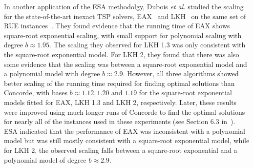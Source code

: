 \documentclass[aic]{iosart2x}
\newcommand{\etal}{\emph{et al.}}
\begin{document}
In another application of the ESA methodolgy, Dubois \etal{} studied the scaling for the state-of-the-art inexact TSP solvers, EAX~\cite{NagKob13} and LKH~\cite{helsgaun2000effective} on the same set of RUE instances~\cite{DubEtAl15}.
They found evidence that the running time of EAX shows square-root exponential scaling, with small support for polynomial scaling with degree $b \approx 1.95$.
The scaling they observed for LKH 1.3 was only consistent with the square-root exponential model. For LKH 2, they found that there was also some evidence that the scaling was between a square-root exponential model and a polynomial model with degree $b \approx 2.9$.
However, all three algorithms showed better scaling of the running time required for finding optimal solutions than Concorde, with bases $b \approx 1.12, 1.20 \text{ and } 1.19$ for the square-root exponential models fitted for EAX, LKH 1.3 and LKH 2, respectively. 
Later, these results were improved using much longer runs of Concorde to find the optimal solutions for nearly all of the instances used in these experiments (see Section 6.3 in~\cite{Mu15}). 
ESA indicated that the performance of EAX was inconsistent with a polynomial model but was still mostly consistent with a square-root exponential model, while for LKH 2, the observed scaling falls between a square-root exponential and a polynomial model of degree $b \approx 2.9$.
\end{document}
